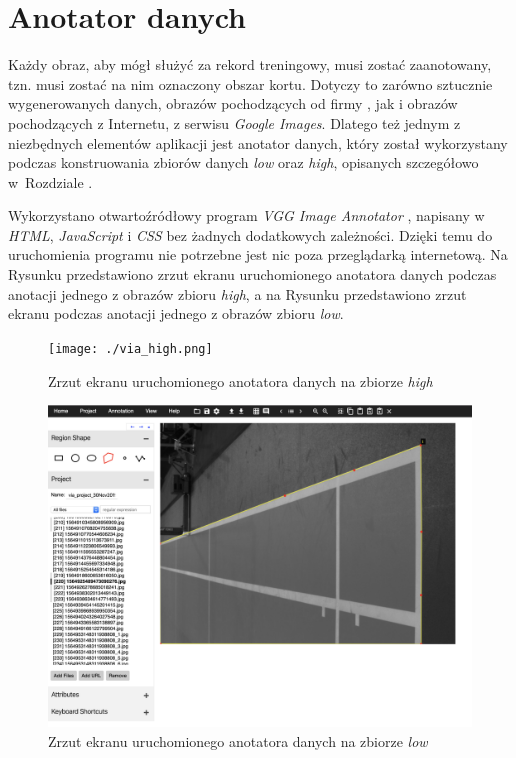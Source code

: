 \newpage
\section{Anotator danych}
\label{sec:anotator}

Każdy obraz, aby mógł służyć za rekord treningowy, musi zostać zaanotowany, tzn. musi zostać na nim oznaczony obszar kortu.
Dotyczy to zarówno sztucznie wygenerowanych danych, obrazów pochodzących od firmy \blue{}, jak i obrazów pochodzących z Internetu, z serwisu \textit{Google Images}.
Dlatego też jednym z niezbędnych elementów aplikacji jest anotator danych, który został wykorzystany podczas konstruowania zbiorów danych \textit{low} oraz \textit{high}, opisanych szczegółowo w~Rozdziale .

Wykorzystano otwartoźródłowy program \textit{VGG Image Annotator} \cite{dutta2016via} \cite{dutta2019vgg}, napisany w \textit{HTML}, \textit{JavaScript} i \textit{CSS} bez żadnych dodatkowych zależności.
Dzięki temu do uruchomienia programu nie potrzebne jest nic poza przeglądarką internetową.
Na Rysunku  przedstawiono zrzut ekranu uruchomionego anotatora danych podczas anotacji jednego z obrazów zbioru \textit{high}, a na Rysunku  przedstawiono zrzut ekranu podczas anotacji jednego z obrazów zbioru \textit{low}.

\vspace{1cm}

\begin{figure}[!htb]
  \texttt{[image: ./via\_high.png]}
    \caption{Zrzut ekranu uruchomionego anotatora danych na zbiorze \textit{high}}
    \label{fig:viahigh}
\end{figure}

\begin{figure}[!htb]
  \includegraphics[width=\linewidth]{./via_low.png}
    \caption{Zrzut ekranu uruchomionego anotatora danych na zbiorze \textit{low}}
    \label{fig:vialow}
\end{figure}
